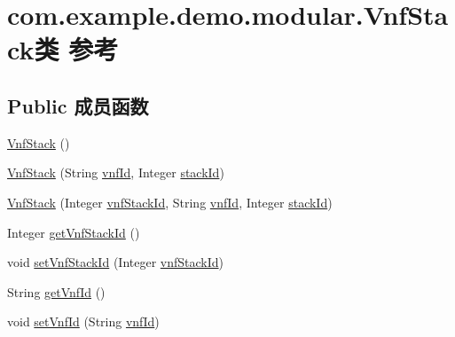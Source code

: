 \hypertarget{classcom_1_1example_1_1demo_1_1modular_1_1_vnf_stack}{}\section{com.\+example.\+demo.\+modular.\+Vnf\+Stack类 参考}
\label{classcom_1_1example_1_1demo_1_1modular_1_1_vnf_stack}
\subsection*{Public 成员函数}
\begin{DoxyCompactItemize}
\item 
\mbox{\hyperlink{classcom_1_1example_1_1demo_1_1modular_1_1_vnf_stack_aaeae30e8f704dc68996106473def996c}{Vnf\+Stack}} ()
\item 
\mbox{\hyperlink{classcom_1_1example_1_1demo_1_1modular_1_1_vnf_stack_a5411bfb615a47f0e9aea99ab861eee50}{Vnf\+Stack}} (String \mbox{\hyperlink{classcom_1_1example_1_1demo_1_1modular_1_1_vnf_stack_abcbee47f229981b7533062f6daea4f4e}{vnf\+Id}}, Integer \mbox{\hyperlink{classcom_1_1example_1_1demo_1_1modular_1_1_vnf_stack_af4df7dc111639b96b4cba90bc63b3b01}{stack\+Id}})
\item 
\mbox{\hyperlink{classcom_1_1example_1_1demo_1_1modular_1_1_vnf_stack_a776452960d95ee444722ae6ddbdb3400}{Vnf\+Stack}} (Integer \mbox{\hyperlink{classcom_1_1example_1_1demo_1_1modular_1_1_vnf_stack_a0ed3f4362c541c67238c094a9c6f85a0}{vnf\+Stack\+Id}}, String \mbox{\hyperlink{classcom_1_1example_1_1demo_1_1modular_1_1_vnf_stack_abcbee47f229981b7533062f6daea4f4e}{vnf\+Id}}, Integer \mbox{\hyperlink{classcom_1_1example_1_1demo_1_1modular_1_1_vnf_stack_af4df7dc111639b96b4cba90bc63b3b01}{stack\+Id}})
\item 
Integer \mbox{\hyperlink{classcom_1_1example_1_1demo_1_1modular_1_1_vnf_stack_ac42be9cdebcdf05ecdf2a6ae3f9f04d1}{get\+Vnf\+Stack\+Id}} ()
\item 
void \mbox{\hyperlink{classcom_1_1example_1_1demo_1_1modular_1_1_vnf_stack_a68ca99f5ded3bb42c62db392a52c7038}{set\+Vnf\+Stack\+Id}} (Integer \mbox{\hyperlink{classcom_1_1example_1_1demo_1_1modular_1_1_vnf_stack_a0ed3f4362c541c67238c094a9c6f85a0}{vnf\+Stack\+Id}})
\item 
String \mbox{\hyperlink{classcom_1_1example_1_1demo_1_1modular_1_1_vnf_stack_a5bbdb76e8237e1cc0c0aaca90e63447d}{get\+Vnf\+Id}} ()
\item 
void \mbox{\hyperlink{classcom_1_1example_1_1demo_1_1modular_1_1_vnf_stack_ae883bbeca1e95a1d8444e8957a17d559}{set\+Vnf\+Id}} (String \mbox{\hyperlink{classcom_1_1example_1_1demo_1_1modular_1_1_vnf_stack_abcbee47f229981b7533062f6daea4f4e}{vnf\+Id}})

\end{DoxyCompactItemize}
